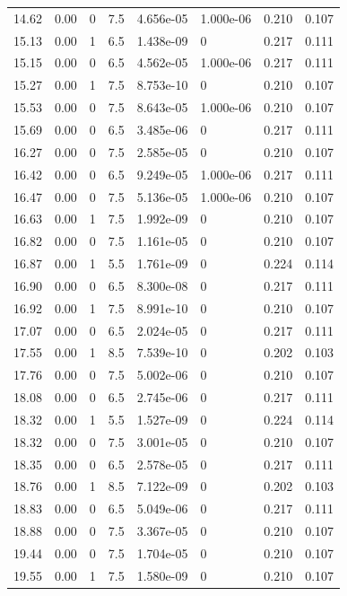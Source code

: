 \documentclass[preview]{standalone}
\begin{document}
{{{\begin{tabular}{L{1.2cm}C{1.2cm} C{0.3cm}C{0.5cm} C{1.4cm}C{1.4cm} C{1.4cm}C{1.4cm}}
  14.62  &  0.00  & 0     & 7.5 &  4.656e-05  & 1.000e-06  & 0.210 &  0.107   \\ 
  15.13  &  0.00  & 1     & 6.5 &  1.438e-09  & 0  & 0.217 &  0.111   \\ 
  15.15  &  0.00  & 0     & 6.5 &  4.562e-05  & 1.000e-06  & 0.217 &  0.111   \\ 
  15.27  &  0.00  & 1     & 7.5 &  8.753e-10  & 0  & 0.210 &  0.107   \\ 
  15.53  &  0.00  & 0     & 7.5 &  8.643e-05  & 1.000e-06  & 0.210 &  0.107   \\ 
  15.69  &  0.00  & 0     & 6.5 &  3.485e-06  & 0  & 0.217 &  0.111   \\ 
  16.27  &  0.00  & 0     & 7.5 &  2.585e-05  & 0  & 0.210 &  0.107   \\ 
  16.42  &  0.00  & 0     & 6.5 &  9.249e-05  & 1.000e-06  & 0.217 &  0.111   \\ 
  16.47  &  0.00  & 0     & 7.5 &  5.136e-05  & 1.000e-06  & 0.210 &  0.107   \\ 
  16.63  &  0.00  & 1     & 7.5 &  1.992e-09  & 0  & 0.210 &  0.107   \\ 
  16.82  &  0.00  & 0     & 7.5 &  1.161e-05  & 0  & 0.210 &  0.107   \\ 
  16.87  &  0.00  & 1     & 5.5 &  1.761e-09  & 0  & 0.224 &  0.114   \\ 
  16.90  &  0.00  & 0     & 6.5 &  8.300e-08  & 0  & 0.217 &  0.111   \\ 
  16.92  &  0.00  & 1     & 7.5 &  8.991e-10  & 0  & 0.210 &  0.107   \\ 
  17.07  &  0.00  & 0     & 6.5 &  2.024e-05  & 0  & 0.217 &  0.111   \\ 
  17.55  &  0.00  & 1     & 8.5 &  7.539e-10  & 0  & 0.202 &  0.103   \\ 
  17.76  &  0.00  & 0     & 7.5 &  5.002e-06  & 0  & 0.210 &  0.107   \\ 
  18.08  &  0.00  & 0     & 6.5 &  2.745e-06  & 0  & 0.217 &  0.111   \\ 
  18.32  &  0.00  & 1     & 5.5 &  1.527e-09  & 0  & 0.224 &  0.114   \\ 
  18.32  &  0.00  & 0     & 7.5 &  3.001e-05  & 0  & 0.210 &  0.107   \\ 
  18.35  &  0.00  & 0     & 6.5 &  2.578e-05  & 0  & 0.217 &  0.111   \\ 
  18.76  &  0.00  & 1     & 8.5 &  7.122e-09  & 0  & 0.202 &  0.103   \\ 
  18.83  &  0.00  & 0     & 6.5 &  5.049e-06  & 0  & 0.217 &  0.111   \\ 
  18.88  &  0.00  & 0     & 7.5 &  3.367e-05  & 0  & 0.210 &  0.107   \\ 
  19.44  &  0.00  & 0     & 7.5 &  1.704e-05  & 0  & 0.210 &  0.107   \\ 
  19.55  &  0.00  & 1     & 7.5 &  1.580e-09  & 0  & 0.210 &  0.107   \\ 
\hline 
\end{tabular} 

}}}
\end{document}
